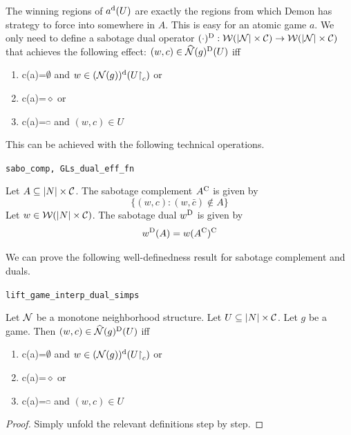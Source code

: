 The winning regions of $a^\text{d}(U)$ are exactly the regions from which Demon has strategy to force into somewhere in $A$. This is easy for an atomic game $a$. We only need to define a sabotage dual operator $(\cdot)^\text{D}:\mathcal W(|\mathcal N|\times \mathcal C)\rightarrow \mathcal W(|\mathcal N|\times \mathcal C)$ that achieves the following effect: $(w,c)\in \widehat{\mathcal N}(g)^\text{D}(U)$ iff
\begin{enumerate}
    \item c(a)=$\emptyset$ and $w\in (\mathcal N(g))^\text{d}(U\mathord{\upharpoonright}_c)$ or
    \item c(a)=$\diamond$ or 
    \item c(a)=$\ssquare$ and $(w,c)\in U$
\end{enumerate}

This can be achieved with the following technical operations.
\begin{bdefinition}
\texttt{sabo\_comp, GLs\_dual\_eff\_fn}

    Let $A\subseteq |N|\times \mathcal C$. The sabotage complement $A^\text{C}$ is given by 
    \begin{equation}
        \{(w,c):(w,\bar c)\notin A\}
    \end{equation}
    Let $w\in \mathcal W(|N|\times \mathcal C)$. The sabotage dual $w^\text{D}$ is given by
    \begin{equation}
        w^\text{D}(A) = w(A^\text{C})^\text{C}
    \end{equation}
\end{bdefinition}

We can prove the following well-definedness result for sabotage complement and duals.
\begin{blemma}

\texttt{lift\_game\_interp\_dual\_simps}

    Let $\mathcal N$ be a monotone neighborhood structure. Let $U\subseteq |N|\times \mathcal C$. Let $g$ be a \GLs{} game. Then $(w,c)\in \widehat{\mathcal N}(g)^\text{D}(U)$ iff
\begin{enumerate}
    \item c(a)=$\emptyset$ and $w\in (\mathcal N(g))^\text{d}(U\mathord{\upharpoonright}_c)$ or
    \item c(a)=$\diamond$ or 
    \item c(a)=$\ssquare$ and $(w,c)\in U$
\end{enumerate}
\end{blemma}
\begin{proof}
    Simply unfold the relevant definitions step by step.
\end{proof}

